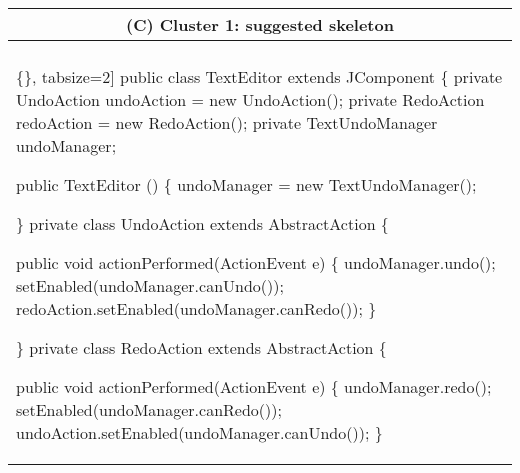 \begin{figure*}[!htb]
 \begin{minipage}{0.5\textwidth}
\scriptsize 
\begin{tabular}{@{}p{}} 
 \hline 
  \multicolumn{1}{c}{(C) Cluster 1: suggested skeleton} \\ \hline
  \vspace{-4mm}
\begin{Verbatim}[commandchars=\\\{\}, tabsize=2]
public class TextEditor extends JComponent \{
    private UndoAction undoAction = new UndoAction();
    private RedoAction redoAction = new RedoAction();
    private TextUndoManager undoManager;

   public TextEditor () \{
     undoManager = new TextUndoManager();
     
     
     
     
     
  \}
 private class UndoAction extends AbstractAction \{
 

  public void actionPerformed(ActionEvent e) \{
    undoManager.undo();
    setEnabled(undoManager.canUndo());
   redoAction.setEnabled(undoManager.canRedo());
 \}
 
 
  \}
  private class RedoAction extends AbstractAction \{ 


  public void actionPerformed(ActionEvent e) \{
   undoManager.redo();
   setEnabled(undoManager.canRedo());
   undoAction.setEnabled(undoManager.canUndo());  
 \}
   

\end{Verbatim}
\end{tabular}
\end{minipage}
\end{figure*}
